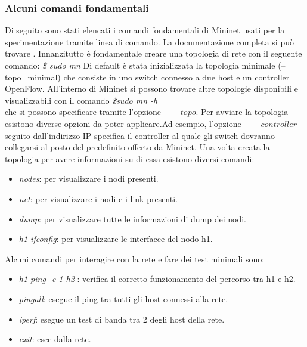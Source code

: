 \subsubsection{Alcuni comandi fondamentali}
Di seguito sono stati elencati i comandi fondamentali di Mininet usati per la sperimentazione tramite linea di comando.
La documentazione completa si può trovare \cite{walkmin}.
\newline Innanzitutto è fondamentale creare una topologia di rete con il seguente comando\cite{walkmin}:
\newline \textit{\$ sudo mn}
\newline Di default è stata inizializzata la topologia minimale (--topo=minimal) che consiste in uno switch connesso a due host e un controller OpenFlow.
All'interno di Mininet si possono trovare altre topologie disponibili e visualizzabili con il comando \newline \textit{\$sudo mn -h} \\che si possono specificare tramite l'opzione $--topo$.
\newline Per avviare la topologia esistono diverse opzioni da poter applicare.Ad esempio, l'opzione $--controller$ seguito dall'indirizzo IP specifica il controller al quale gli switch dovranno collegarsi al posto 
del predefinito offerto da Mininet.
\newline Una volta creata la topologia per avere informazioni su di essa esistono diversi comandi:
\begin{itemize}
    \item \textit{ nodes}: per visualizzare i nodi presenti.
    \item \textit{ net}: per visualizzare i nodi e i link presenti.
    \item \textit{ dump}: per visualizzare tutte le informazioni di dump dei nodi.
    \item \textit{h1 ifconfig}: per visualizzare le interfacce del nodo h1.
\end{itemize}
Alcuni comandi per interagire con la rete e fare dei test minimali sono:
\begin{itemize}
    \item \textit{ h1 ping -c 1 h2 }: verifica il corretto funzionamento del percorso tra h1 e h2.
    \item \textit{ pingall}: esegue il ping tra tutti gli host connessi alla rete.
    \item \textit{ iperf}: esegue un test di banda tra 2 degli host della rete.
    \item \textit{exit}: esce dalla rete.
\end{itemize}
